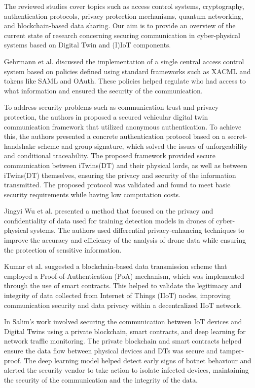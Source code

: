 The reviewed studies cover topics such as access control systems, cryptography, authentication protocols, privacy protection mechanisms, quantum networking, and blockchain-based data sharing. Our aim is to provide an overview of the current state of research concerning securing communication in cyber-physical systems based on Digital Twin and (I)IoT components.

Gehrmann et al. \cite{gehrmannDigitalTwinBased2020} discussed the implementation of a single central access control system based on policies defined using standard frameworks such as XACML and tokens like SAML and OAuth. These policies helped regulate who had access to what information and ensured the security of the communication.


To address security problems such as communication trust and privacy protection, the authors in \cite{xuEfficientAuthenticationVehicular2021} proposed a secured vehicular digital twin communication framework that utilized anonymous authentication. To achieve this, the authors presented a concrete authentication protocol based on a secret-handshake scheme and group signature, which solved the issues of unforgeability and conditional traceability. The proposed framework provided secure communication between iTwins(DT) and their physical lords, as well as between iTwins(DT) themselves, ensuring the privacy and security of the information transmitted. The proposed protocol was validated and found to meet basic security requirements while having low computation costs.

Jingyi Wu et al. \cite{wuDeepLearningDriven2022} presented a method that focused on the privacy and confidentiality of data used for training detection models in drones of cyber-physical systems. The authors used differential privacy-enhancing techniques to improve the accuracy and efficiency of the analysis of drone data while ensuring the protection of sensitive information. 

Kumar et al. \cite{kumarBlockchainDeepLearning2022} suggested a blockchain-based data transmission scheme that employed a Proof-of-Authentication (PoA) mechanism, which was implemented through the use of smart contracts. This helped to validate the legitimacy and integrity of data collected from Internet of Things (IIoT) nodes, improving communication security and data privacy within a decentralized IIoT network. 

In \cite{salimBlockchainEnabledSecureDigital2022} Salim's work involved securing the communication between IoT devices and Digital Twins using a private blockchain, smart contracts, and deep learning for network traffic monitoring. The private blockchain and smart contracts helped ensure the data flow between physical devices and DTs was secure and tamper-proof. The deep learning model helped detect early signs of botnet behaviour and alerted the security vendor to take action to isolate infected devices, maintaining the security of the communication and the integrity of the data. 


